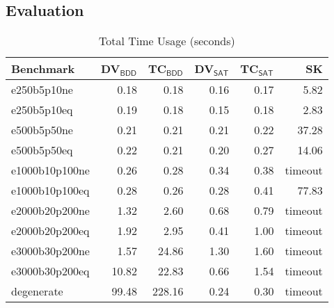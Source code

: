 \documentclass[conference]{IEEEtran}
\begin{document}
\subsection{Evaluation}\label{sec:performance-implementation}
\begin{table}
\footnotesize
\centering
\setlength{\tabcolsep}{3pt}
\begin{tabular}{l r r r r r}
    Benchmark & DV$_{\textsf{BDD}}$ & TC$_{\textsf{BDD}}$ & DV$_{\textsf{SAT}}$ & TC$_{\textsf{SAT}}$ & SK \\
    \hline
    e250b5p10ne    & 0.18   & 0.18   & 0.16 & 0.17 &    5.82 \\
    e250b5p10eq    & 0.19   & 0.18   & 0.15 & 0.18 &    2.83 \\
    e500b5p50ne    & 0.21   & 0.21   & 0.21 & 0.22 &   37.28 \\
    e500b5p50eq    & 0.22   & 0.21   & 0.20 & 0.27 &   14.06 \\
    e1000b10p100ne & 0.26   & 0.28   & 0.34 & 0.38 & timeout \\
    e1000b10p100eq & 0.28   & 0.26   & 0.28 & 0.41 &   77.83 \\
    e2000b20p200ne & 1.32   & 2.60   & 0.68 & 0.79 & timeout \\
    e2000b20p200eq & 1.92   & 2.95   & 0.41 & 1.00 & timeout \\
    e3000b30p200ne & 1.57   & 24.86  & 1.30 & 1.60 & timeout \\
    e3000b30p200eq & 10.82  & 22.83  & 0.66 & 1.54 & timeout \\
    degenerate     & 99.48  & 228.16 & 0.24 & 0.30 & timeout
\end{tabular}
\caption{Total Time Usage (seconds)}\label{tab:benchmark-time}
\end{table}
\end{document}
